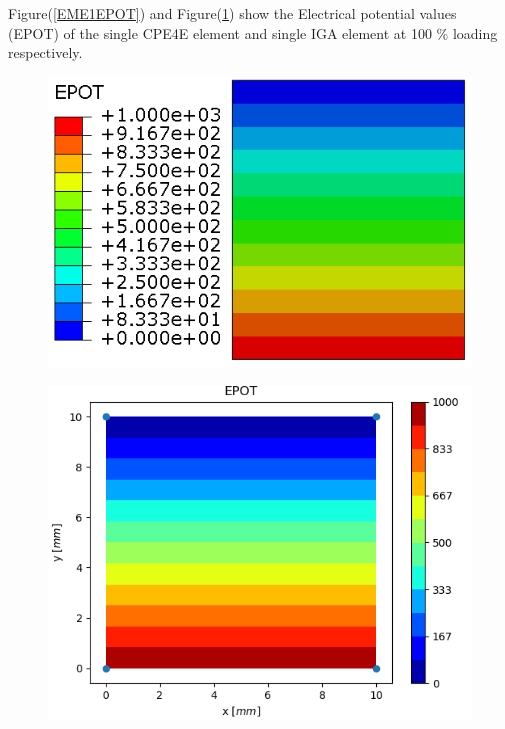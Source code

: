 \documentclass[11pt]{article}
\begin{document}
Figure(\ref{EME1EPOT}) and Figure(\ref{EME1EPOT_IGA}) show the Electrical potential values (EPOT) of the single CPE4E element and single IGA element at 100 \% loading respectively. \\
\begin{figure}[H]
	\centering
	\begin{minipage}{.5\textwidth}
		\centering
		\includegraphics[width=1\linewidth]{EME1EPOT.png}
		\label{EME1EPOT}
	\end{minipage}%
	\begin{minipage}{.5\textwidth}
		\centering
		\includegraphics[width=1\linewidth]{EME1EPOT_IGA.png}
		\label{EME1EPOT_IGA}
	\end{minipage}
\end{figure}
\end{document}
